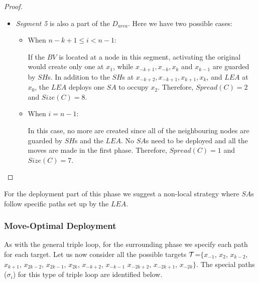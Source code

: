 \begin{proof}
\begin{itemize}
\item  {\em Segment 5}  is also a part of the $D_{area}$. Here we have two possible cases:

\begin{itemize}
\item When $n-k+1 \leq i < n-1$:

If the $BV$ is located at a node in this segment, activating the original \bv would create only one \bv at $x_{1}$, while $x_{-k+1},x_{-k},x_{k}$ and $x_{k-1}$ are guarded by $SH$s. In addition to the $SH$s at $x_{-k+2},x_{-k+1},x_{k+1},x_{k}$, and $LEA$ at $x_{0}$, the $LEA$ deploys one  $SA$ to occupy $x_{2}$. Therefore, $Spread(C)=2$ and $Size(C)=8$.  

\item  When $i=n-1$: %
 
In this case, no more \bvs are created since all of the neighbouring nodes are guarded by $SH$s and the $LEA$. No $SA$s need to be deployed and all the moves are made in the first phase. Therefore, $Spread(C)=1$ and $Size(C)=7$.  
\end{itemize}
\end{itemize}
\end{proof}
For the deployment part of this phase we suggest   a non-local strategy where $SA$s follow  specific paths set up by the $LEA$.

\subsubsection{Move-Optimal Deployment}
As with the general triple loop, for the surrounding phase  we specify each path for each target. Let us now consider all the possible targets ${\cal T}$=$\{x_{-1}$, $ x_{2}$,  $x_{k-2}$, $x_{k+1}$, $x_{2k-2}$, $x_{2k-1}$, $x_{2k}$, $x_{-k+2}$, $x_{-k-1}$  $x_{-2k+2}$, $x_{-2k+1}$, $x_{-2k}\}$.  The  special paths ($\sigma_i$) for this type of triple loop are identified below. 


